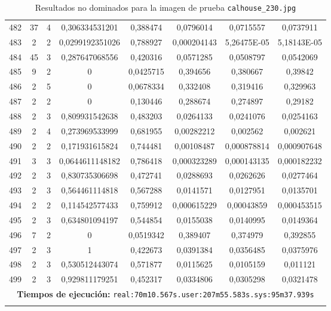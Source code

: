 \begin{longtable}{|c|c|c|c|c|c|c|c|}
482 & 37 & 4 & 0,306334531201 & 0,388474 & 0,0796014 & 0,0715557 & 0,0737911  \\
483 & 2 & 2 & 0,0299192351026 & 0,788927 & 0,000204143 & 5,26475E-05 & 5,18143E-05  \\
484 & 45 & 3 & 0,287647068556 & 0,420316 & 0,0571285 & 0,0508797 & 0,0542069  \\
485 & 9 & 2 & 0 & 0,0425715 & 0,394656 & 0,380667 & 0,39842  \\
486 & 2 & 5 & 0 & 0,0678334 & 0,332408 & 0,319416 & 0,329963  \\
487 & 2 & 2 & 0 & 0,130446 & 0,288674 & 0,274897 & 0,29182  \\
488 & 2 & 3 & 0,809931542638 & 0,483203 & 0,0264133 & 0,0241076 & 0,0254163  \\
489 & 2 & 4 & 0,273969533999 & 0,681955 & 0,00282212 & 0,002562 & 0,002621  \\
490 & 2 & 2 & 0,171931615824 & 0,744481 & 0,00108487 & 0,000878814 & 0,000907648  \\
491 & 3 & 3 & 0,0644611148182 & 0,786418 & 0,000323289 & 0,000143135 & 0,000182232  \\
492 & 2 & 3 & 0,830735306698 & 0,472741 & 0,0288693 & 0,0262626 & 0,0277464  \\
493 & 2 & 3 & 0,564461114818 & 0,567288 & 0,0141571 & 0,0127951 & 0,0135701  \\
494 & 2 & 2 & 0,114542577433 & 0,759912 & 0,000615229 & 0,00043859 & 0,000453515  \\
495 & 2 & 3 & 0,634801094197 & 0,544854 & 0,0155038 & 0,0140995 & 0,0149364  \\
496 & 7 & 2 & 0 & 0,0519342 & 0,389407 & 0,374979 & 0,392855  \\
497 & 2 & 3 & 1 & 0,422673 & 0,0391384 & 0,0356485 & 0,0375976  \\
498 & 2 & 3 & 0,530512443074 & 0,571877 & 0,0115625 & 0,0105159 & 0,011121  \\
499 & 2 & 3 & 0,929811179251 & 0,452317 & 0,0334806 & 0,0305298 & 0,0321478  \\
\hline
\multicolumn{8}{|c|}{\textbf{Tiempos de ejecución:} \texttt{real:70m10.567s.user:207m55.583s.sys:95m37.939s}}\\  \hline
\caption{Resultados no dominados para la imagen de prueba \texttt{calhouse\_230.jpg}}
\label{tab:calhouse_230}
\end{longtable}
\normalsize

